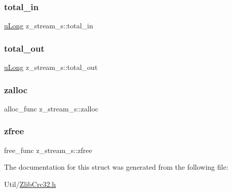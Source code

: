 \subsubsection{\texorpdfstring{total\+\_\+in}{total\_in}}
{\footnotesize\ttfamily \mbox{\hyperlink{ZlibCrc32_8h_acd2a5701a3aecf6700d2c66c606ecb40}{u\+Long}} z\+\_\+stream\+\_\+s\+::total\+\_\+in}

\mbox{\label{structz__stream__s_abae26f1f236cf920250b9d37fdf009c1}} 
\subsubsection{\texorpdfstring{total\+\_\+out}{total\_out}}
{\footnotesize\ttfamily \mbox{\hyperlink{ZlibCrc32_8h_acd2a5701a3aecf6700d2c66c606ecb40}{u\+Long}} z\+\_\+stream\+\_\+s\+::total\+\_\+out}

\mbox{\label{structz__stream__s_a23a2299c384f808e76e9908f21216b0f}} 
\subsubsection{\texorpdfstring{zalloc}{zalloc}}
{\footnotesize\ttfamily alloc\+\_\+func z\+\_\+stream\+\_\+s\+::zalloc}

\mbox{\label{structz__stream__s_a89eb750ade7f4f0b56bfdadf13344982}} 
\subsubsection{\texorpdfstring{zfree}{zfree}}
{\footnotesize\ttfamily free\+\_\+func z\+\_\+stream\+\_\+s\+::zfree}



The documentation for this struct was generated from the following file\+:\begin{DoxyCompactItemize}
\item 
Util/\mbox{\hyperlink{ZlibCrc32_8h}{Zlib\+Crc32.\+h}}\end{DoxyCompactItemize}
